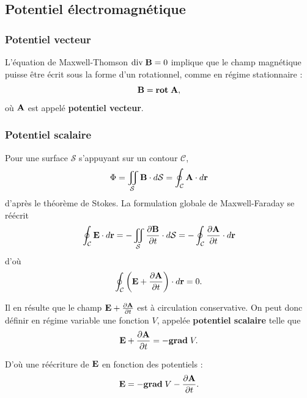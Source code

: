 \documentclass[11pt,a4paper]{report}
\begin{document}
\subsection{Potentiel électromagnétique}

\subsubsection{Potentiel vecteur}
L'équation de Maxwell-Thomson $\text{div}\;\bold{B} = 0$ implique que le champ magnétique puisse être écrit sous la forme d'un rotationnel, comme en régime stationnaire :
\begin{equation}
	\bold{B} = \textbf{rot}\;\bold{A},
\end{equation}
où $\bold{A}$ est appelé \textbf{potentiel vecteur}.

\subsubsection{Potentiel scalaire}
Pour une surface $\mathcal{S}$ s'appuyant sur un contour $\mathcal{C}$,
\begin{equation}
	\Phi = \iint_\mathcal{S}\bold{B}\cdot d\bold{\mathcal{S}} = \oint_\mathcal{C} \bold{A}\cdot d\bold{r}
\end{equation}
d'après le théorème de Stokes. La formulation globale de Maxwell-Faraday se réécrit
\begin{equation}
	\oint_\mathcal{C}\bold{E}\cdot d\bold{r} = - \iint_\mathcal{S}\frac{\partial\bold{B}}{\partial t}\cdot d\mathcal{S} 
	= -\oint_\mathcal{C} \frac{\partial \bold{A}}{\partial t}\cdot d\bold{r}
\end{equation}
d'où
\begin{equation}
	\oint_\mathcal{C}\left(\bold{E} + \frac{\partial \bold{A}}{\partial t} \right)\cdot d\bold{r} = 0.
\end{equation}

Il en résulte que le champ $\bold{E}+ \frac{\partial \bold{A}}{\partial t}$ est à circulation conservative. On peut donc définir en régime variable une fonction $V$, appelée \textbf{potentiel scalaire} telle que
\begin{equation}
	\bold{E} + \frac{\partial \bold{A}}{\partial t} = - \textbf{grad}\;V.
\end{equation}

D'où une réécriture de $\bold{E}$ en fonction des potentiels :
\begin{equation}
	\bold{E} = - \textbf{grad}\;V - \frac{\partial \bold{A}}{\partial t}.
\end{equation}
\end{document}
